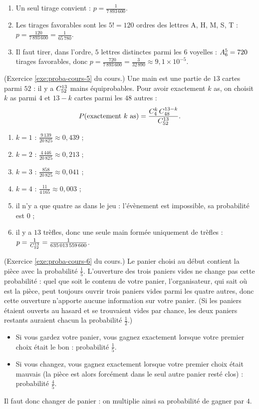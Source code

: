 \begin{corrige}
\begin{sol}
\begin{enumerate}
      $\A{26}{5} = 26\times 25\times 24\times 23\times 22 = 7\,893\,600$ tirages, tous \'equiprobables.
\item Un seul tirage convient : $p = \frac{1}{7\,893\,600}$.
\item Les tirages favorables sont les $5! = 120$ ordres des lettres A, H, M, S, T :
      $p = \frac{120}{7\,893\,600} = \frac{1}{65\,780}$.
\item Il faut tirer, dans l'ordre, $5$ lettres distinctes parmi les $6$ voyelles : $A_{6}^{5} = 720$ tirages favorables, donc
      $p = \frac{720}{7\,893\,600} = \frac{3}{32\,890} \approx 9,1\times 10^{-5}$.
\end{enumerate}
\end{sol}
%
\begin{sol} (Exercice \ref{exe:proba-cours-5} du cours.)
Une main est une partie de $13$ cartes parmi $52$ : il y a $C_{52}^{13}$ mains \'equiprobables.
Pour avoir exactement $k$ as, on choisit $k$ as parmi $4$ et $13-k$ cartes parmi les $48$ autres :
\[
P(\text{exactement } k \text{ as}) = \frac{C_{4}^{k}\,C_{48}^{13-k}}{C_{52}^{13}} .
\]
\begin{enumerate}
\item $k=1$ : $\frac{9\,139}{20\,825}\approx 0,439$ ;
\item $k=2$ : $\frac{4\,446}{20\,825}\approx 0,213$ ;
\item $k=3$ : $\frac{858}{20\,825}\approx 0,041$ ;
\item $k=4$ : $\frac{11}{4\,165}\approx 0,003$ ;
\item il n'y a que quatre as dans le jeu : l'\'ev\`enement est impossible, sa probabilit\'e est $0$ ;
\item il y a $13$ tr\`efles, donc une seule main form\'ee uniquement de tr\`efles :
      $p = \frac{1}{C_{52}^{13}} = \frac{1}{635\,013\,559\,600}$.
\end{enumerate}
\end{sol}
%
\begin{sol} (Exercice \ref{exe:proba-cours-6} du cours.)
Le panier choisi au d\'ebut contient la pi\`ece avec la probabilit\'e $\frac{1}{5}$.
L'ouverture des trois paniers vides ne change pas cette probabilit\'e : quel que soit le contenu de votre panier,
l'organisateur, qui sait o\`u est la pi\`ece, peut toujours ouvrir trois paniers vides parmi les quatre autres, donc cette ouverture n'apporte aucune information sur votre panier.
(Si les paniers \'etaient ouverts au hasard et se trouvaient vides par chance, les deux paniers restants auraient chacun la probabilit\'e $\frac{1}{2}$.)
\begin{itemize}
\item Si vous gardez votre panier, vous gagnez exactement lorsque votre premier choix \'etait le bon : probabilit\'e $\frac{1}{5}$.
\item Si vous changez, vous gagnez exactement lorsque votre premier choix \'etait mauvais
      (la pi\`ece est alors forc\'ement dans le seul autre panier rest\'e clos) : probabilit\'e $\frac{4}{5}$.
\end{itemize}
Il faut donc changer de panier : on multiplie ainsi sa probabilit\'e de gagner par $4$.
\end{sol}
%

\end{corrige}
